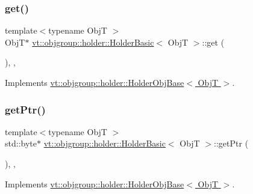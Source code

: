 \subsubsection{\texorpdfstring{get()}{get()}}
{\footnotesize\ttfamily template$<$typename ObjT $>$ \\
ObjT$\ast$ \hyperlink{structvt_1_1objgroup_1_1holder_1_1_holder_basic}{vt\+::objgroup\+::holder\+::\+Holder\+Basic}$<$ ObjT $>$\+::get (\begin{DoxyParamCaption}{ }\end{DoxyParamCaption})\hspace{0.3cm}{\ttfamily [inline]}, {\ttfamily [override]}, {\ttfamily [virtual]}}



Implements \hyperlink{structvt_1_1objgroup_1_1holder_1_1_holder_obj_base_a4b350b0126259d31a62fd426a08f6698}{vt\+::objgroup\+::holder\+::\+Holder\+Obj\+Base$<$ Obj\+T $>$}.

\mbox{\label{structvt_1_1objgroup_1_1holder_1_1_holder_basic_a857b56b22964a3524169f6fa30307d65}} 
\subsubsection{\texorpdfstring{get\+Ptr()}{getPtr()}}
{\footnotesize\ttfamily template$<$typename ObjT $>$ \\
std\+::byte$\ast$ \hyperlink{structvt_1_1objgroup_1_1holder_1_1_holder_basic}{vt\+::objgroup\+::holder\+::\+Holder\+Basic}$<$ ObjT $>$\+::get\+Ptr (\begin{DoxyParamCaption}{ }\end{DoxyParamCaption})\hspace{0.3cm}{\ttfamily [inline]}, {\ttfamily [override]}, {\ttfamily [virtual]}}



Implements \hyperlink{structvt_1_1objgroup_1_1holder_1_1_holder_obj_base_abd46e1aa84c0fea2554bf19029581e01}{vt\+::objgroup\+::holder\+::\+Holder\+Obj\+Base$<$ Obj\+T $>$}.

\mbox{\label{structvt_1_1objgroup_1_1holder_1_1_holder_basic_a8595e53a2006f9b0156712054fc1602c}} 
